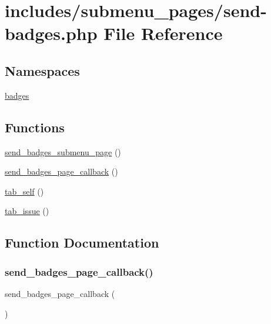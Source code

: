 \hypertarget{send-badges_8php}{}\section{includes/submenu\+\_\+pages/send-\/badges.php File Reference}
\label{send-badges_8php}
\subsection*{Namespaces}
\begin{DoxyCompactItemize}
\item 
 \hyperlink{namespacebadges}{badges}
\end{DoxyCompactItemize}
\subsection*{Functions}
\begin{DoxyCompactItemize}
\item 
\hyperlink{send-badges_8php_ae422f726cb1a2a17a82e59d61feab727}{send\+\_\+badges\+\_\+submenu\+\_\+page} ()
\item 
\hyperlink{send-badges_8php_a19dbce85de3fc38cfe75aa8b3ce13763}{send\+\_\+badges\+\_\+page\+\_\+callback} ()
\item 
\hyperlink{send-badges_8php_a31382084e2c0ab850e695b2963199fe9}{tab\+\_\+self} ()
\item 
\hyperlink{send-badges_8php_a0209048029fcb87785fc5c799516af97}{tab\+\_\+issue} ()
\end{DoxyCompactItemize}


\subsection{Function Documentation}
\mbox{\label{send-badges_8php_a19dbce85de3fc38cfe75aa8b3ce13763}} 
\subsubsection{\texorpdfstring{send\+\_\+badges\+\_\+page\+\_\+callback()}{send\_badges\_page\_callback()}}
{\footnotesize\ttfamily send\+\_\+badges\+\_\+page\+\_\+callback (\begin{DoxyParamCaption}{ }\end{DoxyParamCaption})}

